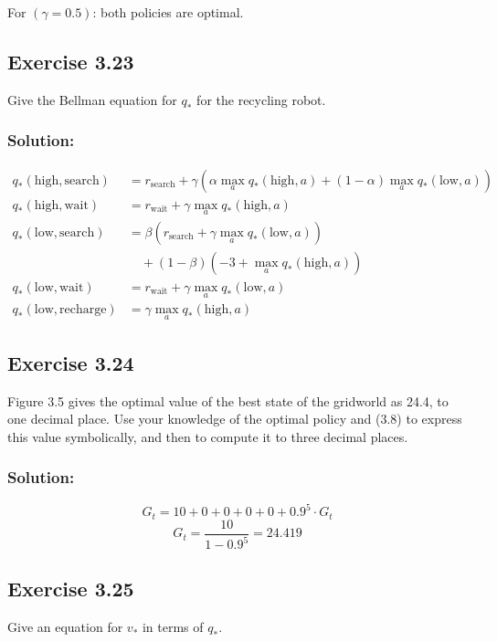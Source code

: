 For $(\gamma = 0.5)$: both policies are optimal.

\subsection*{Exercise 3.23}
Give the Bellman equation for $q_*$ for the recycling robot.

\subsubsection*{Solution:}

\begin{align*}
    q_*(\text{high}, \text{search}) &= r_\text{search} + \gamma \left( \alpha \max_a q_*(\text{high}, a) + (1 - \alpha) \max_a q_*(\text{low}, a) \right) \\
    q_*(\text{high}, \text{wait}) &= r_\text{wait} + \gamma \max_aq_*(\text{high}, a) \\
    q_*(\text{low}, \text{search}) &= \beta \left( r_\text{search} + \gamma  \max_a q_*(\text{low}, a) \right) \\
    &\quad + (1 - \beta) \left(-3 + \max_a q_*(\text{high}, a) \right) \\
    q_*(\text{low}, \text{wait}) &= r_\text{wait} + \gamma \max_aq_*(\text{low}, a) \\
    q_*(\text{low}, \text{recharge}) &= \gamma \max_aq_*(\text{high}, a)
\end{align*}

\subsection*{Exercise 3.24}
Figure 3.5 gives the optimal value of the best state of the gridworld as
24.4, to one decimal place. Use your knowledge of the optimal policy and (3.8) to express
this value symbolically, and then to compute it to three decimal places. 

\subsubsection*{Solution:}

\[
G_t = 10 + 0 + 0 + 0 + 0 + 0.9^5 \cdot G_t
\]
\[
G_t = \frac{10}{1-0.9^5} = 24.419
\]


\subsection*{Exercise 3.25}
Give an equation for $v_*$ in terms of $q_*$.

